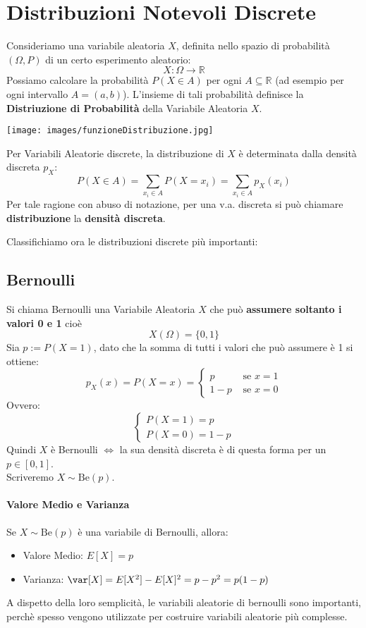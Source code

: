 \section{Distribuzioni Notevoli Discrete}
Consideriamo una variabile aleatoria $X$, definita nello spazio di probabilità
$(\Omega, P)$ di un certo esperimento aleatorio:
\[
    X:\Omega \rightarrow \mathbb{R} 
\]
Possiamo calcolare la probabilità $P(X \in A)$ per ogni $A \subseteq \mathbb{R}$
(ad esempio per ogni intervallo $A=(a,b)$).
L'insieme di tali probabilità definisce la \textbf{Distriuzione di Probabilità} della Variabile Aleatoria $X$.
\begin{center}
    \texttt{[image: images/funzioneDistribuzione.jpg]}
\end{center}

Per Variabili Aleatorie discrete, la distribuzione di $X$ è determinata dalla densità discreta $p_X$:
\[
    P(X \in A) = \sum_{x_i \in A} P(X=x_i) = \sum_{x_i \in A} p_X(x_i)  
\]
Per tale ragione con abuso di notazione, per una v.a. discreta si può chiamare
\textbf{distribuzione} la \textbf{densità discreta}.

Classifichiamo ora le distribuzioni discrete più importanti:

\subsection{Bernoulli}
Si chiama Bernoulli una Variabile Aleatoria $X$ che può \textbf{assumere soltanto i valori 0 e 1} cioè
\[
    X(\Omega) = \{0,1\}
\]
Sia $p:=P(X=1)$, dato che la somma di tutti i valori che può assumere è 1 si ottiene:
\[
    p_X (x) = P(X=x) = 
    \begin{cases}
    p  & \text{ se } x=1\\
    1-p  & \text{ se } x=0
    \end{cases} 
\]
Ovvero:
\[
    \begin{cases}
        P(X=1) = p\\
        P(X=0)= 1-p
    \end{cases}
\]
Quindi $X$ è Bernoulli $\Leftrightarrow$ la sua densità discreta è di questa
forma per un $p \in [0,1]$.
\\ Scriveremo $X \sim \text{Be}(p)$.

\paragraph{Valore Medio e Varianza}
Se $X \sim \text{Be}(p)$ è una variabile di Bernoulli, allora:
\begin{itemize}
    \item Valore Medio: $E[X] = p$
    \item Varianza: $\var[X] = E[X^2] - E[X]^2 = p-p^2 = p(1-p)$
\end{itemize}
A dispetto della loro semplicità, le variabili aleatorie di bernoulli sono importanti, perchè spesso
vengono utilizzate per costruire variabili aleatorie più complesse.

